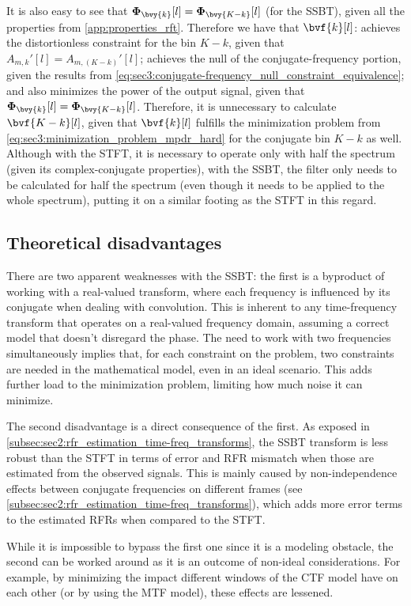 It is also easy to see that $\Corr{\bvy{k}}[l] = \Corr{\bvy{K-k}}[l]$ (for the SSBT), given all the properties from \cref{app:properties_rft}. Therefore we have that $\bvf{k}[l]$: achieves the distortionless constraint for the bin $K-k$, given that $A_{m,k}'[l] = A_{m,(K-k)}'[l]$; achieves the null of the conjugate-frequency portion, given the results from \cref{eq:sec3:conjugate-frequency_null_constraint_equivalence}; and also minimizes the power of the output signal, given that $\Corr{\bvy{k}}[l] = \Corr{\bvy{K-k}}[l]$. Therefore, it is unnecessary to calculate $\bvf{K-k}[l]$, given that $\bvf{k}[l]$ fulfills the minimization problem from \cref{eq:sec3:minimization_problem_mpdr_hard} for the conjugate bin $K-k$ as well. Although with the STFT, it is necessary to operate only with half the spectrum (given its complex-conjugate properties), with the SSBT, the filter only needs to be calculated for half the spectrum (even though it needs to be applied to the whole spectrum), putting it on a similar footing as the STFT in this regard.

\subsection{Theoretical disadvantages}

There are two apparent weaknesses with the SSBT: the first is a byproduct of working with a real-valued transform, where each frequency is influenced by its conjugate when dealing with convolution. This is inherent to any time-frequency transform that operates on a real-valued frequency domain, assuming a correct model that doesn't disregard the phase. The need to work with two frequencies simultaneously implies that, for each constraint on the problem, two constraints are needed in the mathematical model, even in an ideal scenario. This adds further load to the minimization problem, limiting how much noise it can minimize.

The second disadvantage is a direct consequence of the first. As exposed in \cref{subsec:sec2:rfr_estimation_time-freq_transforms}, the SSBT transform is less robust than the STFT in terms of error and RFR mismatch when those are estimated from the observed signals. This is mainly caused by non-independence effects between conjugate frequencies on different frames (see \cref{subsec:sec2:rfr_estimation_time-freq_transforms}), which adds more error terms to the estimated RFRs when compared to the STFT.

While it is impossible to bypass the first one since it is a modeling obstacle, the second can be worked around as it is an outcome of non-ideal considerations. For example, by minimizing the impact different windows of the CTF model have on each other (or by using the MTF model), these effects are lessened.